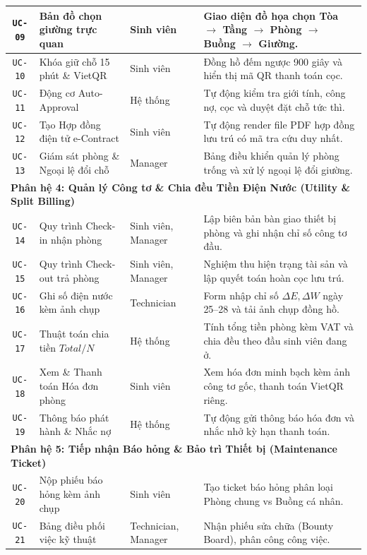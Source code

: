 \begin{table}[htbp]
\begin{tabularx}{\textwidth}{|c|l|l|X|}
\texttt{UC-09} & Bản đồ chọn giường trực quan & Sinh viên & Giao diện đồ họa chọn Tòa $\rightarrow$ Tầng $\rightarrow$ Phòng $\rightarrow$ Buồng $\rightarrow$ Giường. \\ \hline
\texttt{UC-10} & Khóa giữ chỗ 15 phút \& VietQR & Sinh viên & Đồng hồ đếm ngược 900 giây và hiển thị mã QR thanh toán cọc. \\ \hline
\texttt{UC-11} & Động cơ Auto-Approval & Hệ thống & Tự động kiểm tra giới tính, công nợ, cọc và duyệt đặt chỗ tức thì. \\ \hline
\texttt{UC-12} & Tạo Hợp đồng điện tử e-Contract & Sinh viên & Tự động render file PDF hợp đồng lưu trú có mã tra cứu duy nhất. \\ \hline
\texttt{UC-13} & Giám sát phòng \& Ngoại lệ đổi chỗ & Manager & Bảng điều khiển quản lý phòng trống và xử lý ngoại lệ đổi giường. \\ \hline
\multicolumn{4}{|l|}{\textbf{Phân hệ 4: Quản lý Công tơ \& Chia đều Tiền Điện Nước (Utility \& Split Billing)}} \\ \hline
\texttt{UC-14} & Quy trình Check-in nhận phòng & Sinh viên, Manager & Lập biên bản bàn giao thiết bị phòng và ghi nhận chỉ số công tơ đầu. \\ \hline
\texttt{UC-15} & Quy trình Check-out trả phòng & Sinh viên, Manager & Nghiệm thu hiện trạng tài sản và lập quyết toán hoàn cọc lưu trú. \\ \hline
\texttt{UC-16} & Ghi số điện nước kèm ảnh chụp & Technician & Form nhập chỉ số $\Delta E, \Delta W$ ngày 25--28 và tải ảnh chụp đồng hồ. \\ \hline
\texttt{UC-17} & Thuật toán chia tiền $Total / N$ & Hệ thống & Tính tổng tiền phòng kèm VAT và chia đều theo đầu sinh viên đang ở. \\ \hline
\texttt{UC-18} & Xem \& Thanh toán Hóa đơn phòng & Sinh viên & Xem hóa đơn minh bạch kèm ảnh công tơ gốc, thanh toán VietQR riêng. \\ \hline
\texttt{UC-19} & Thông báo phát hành \& Nhắc nợ & Hệ thống & Tự động gửi thông báo hóa đơn và nhắc nhở kỳ hạn thanh toán. \\ \hline
\multicolumn{4}{|l|}{\textbf{Phân hệ 5: Tiếp nhận Báo hỏng \& Bảo trì Thiết bị (Maintenance Ticket)}} \\ \hline
\texttt{UC-20} & Nộp phiếu báo hỏng kèm ảnh chụp & Sinh viên & Tạo ticket báo hỏng phân loại Phòng chung vs Buồng cá nhân. \\ \hline
\texttt{UC-21} & Bảng điều phối việc kỹ thuật & Technician, Manager & Nhận phiếu sửa chữa (Bounty Board), phân công công việc. \\ \hline

\end{tabularx}
\end{table}
